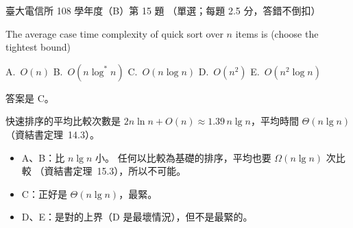 \begin{pastexam}[label={px:ntu-108-comm-dsab-15}]{臺大電信所 108 學年度（B）第 15 題}
（單選；每題 2.5 分，答錯不倒扣）

The average case time complexity of quick sort over $n$ items is (choose the tightest bound)

A.~$O(n)$ \qquad B.~$O(n\log^* n)$ \qquad C.~$O(n\log n)$ \qquad D.~$O(n^2)$ \qquad
E.~$O(n^2\log n)$
\end{pastexam}

\begin{pastsoln}
答案是 C。

快速排序的平均比較次數是 $2n \ln n + O(n) \approx 1.39\, n \lg n$，平均時間 $\Theta(n \lg n)$
（資結書定理~14.3）。
\begin{itemize}
\item A、B：比 $n \lg n$ 小。 任何以比較為基礎的排序，平均也要 $\Omega(n \lg n)$ 次比較
（資結書定理~15.3），所以不可能。
\item C：正好是 $\Theta(n \lg n)$，最緊。
\item D、E：是對的上界（D 是最壞情況），但不是最緊的。
\end{itemize}
\end{pastsoln}

